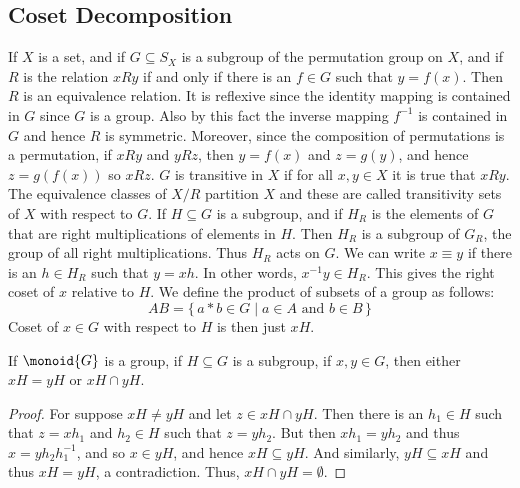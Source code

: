 \documentclass{book}                                                           %
\begin{document}
        \subsection{Coset Decomposition}
            If $X$ is a set, and if $G\subseteq{S}_{X}$ is a subgroup of the
            permutation group on $X$, and if $R$ is the relation
            $xRy$ if and only if there is an $f\in{G}$ such that
            $y=f(x)$. Then $R$ is an equivalence relation. It is reflexive
            since the identity mapping is contained in $G$ since $G$ is a
            group. Also by this fact the inverse mapping $f^{\minus{1}}$ is
            contained in $G$ and hence $R$ is symmetric. Moreover, since the
            composition of permutations is a permutation, if $xRy$ and
            $yRz$, then $y=f(x)$ and $z=g(y)$, and hence $z=g(f(x))$ so
            $xRz$. $G$ is transitive in $X$ if for all $x,y\in{X}$ it is
            true that $xRy$. The equivalence classes of $X/R$ partition $X$
            and these are called transitivity sets of $X$ with respect to
            $G$. If $H\subseteq{G}$ is a subgroup, and if $H_{R}$ is the
            elements of $G$ that are right multiplications of elements in
            $H$. Then $H_{R}$ is a subgroup of $G_{R}$, the group of all
            right multiplications. Thus $H_{R}$ acts on $G$. We can write
            $x\equiv{y}$ if there is an $h\in{H}_{R}$ such that $y=xh$. In
            other words, $x^{\minus{1}}y\in{H}_{R}$. This gives the right
            coset of $x$ relative to $H$. We define the product of subsets
            of a group as follows:
            \begin{equation}
                AB=\{\,a*b\in{G}\;|\;a\in{A}\textrm{ and }b\in{B}\,\}
            \end{equation}
            Coset of $x\in{G}$ with respect to $H$ is then just $xH$.
            \begin{theorem}
                If $\monoid{G}$ is a group, if $H\subseteq{G}$ is a
                subgroup, if $x,y\in{G}$, then either $xH=yH$ or
                $xH\cap{y}H$.
            \end{theorem}
            \begin{proof}
                For suppose $xH\ne{y}H$ and let $z\in{x}H\cap{y}H$. Then
                there is an $h_{1}\in{H}$ such that $z=xh_{1}$ and
                $h_{2}\in{H}$ such that $z=yh_{2}$. But then
                $xh_{1}=yh_{2}$ and thus $x=yh_{2}h_{1}^{\minus{1}}$, and
                so $x\in{y}H$, and hence $xH\subseteq{y}H$. And similarly,
                $yH\subseteq{x}H$ and thus $xH=yH$, a contradiction. Thus,
                $xH\cap{y}H=\emptyset$.
            \end{proof}
\end{document}
